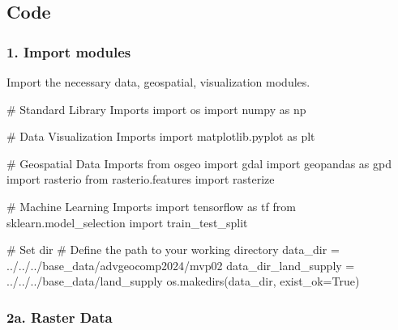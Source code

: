 \documentclass[
  letterpaper,
]{article}
\newenvironment{Shaded}{\begin{snugshade}}{\end{snugshade}}
\newcommand{\CommentTok}[1]{\textcolor[rgb]{0.37,0.37,0.37}{#1}}
\newcommand{\ImportTok}[1]{\textcolor[rgb]{0.00,0.46,0.62}{#1}}
\newcommand{\NormalTok}[1]{\textcolor[rgb]{0.00,0.23,0.31}{#1}}
\newcommand{\OperatorTok}[1]{\textcolor[rgb]{0.37,0.37,0.37}{#1}}
\newcommand{\StringTok}[1]{\textcolor[rgb]{0.13,0.47,0.30}{#1}}
\newcommand{\VariableTok}[1]{\textcolor[rgb]{0.07,0.07,0.07}{#1}}
\begin{document}
\subsection{Code}\label{code}

\subsubsection{1. Import modules}\label{import-modules}

Import the necessary data, geospatial, visualization modules.

\begin{Shaded}
\begin{Highlighting}[]
\CommentTok{\# Standard Library Imports}
\ImportTok{import}\NormalTok{ os}
\ImportTok{import}\NormalTok{ numpy }\ImportTok{as}\NormalTok{ np}

\CommentTok{\# Data Visualization Imports}
\ImportTok{import}\NormalTok{ matplotlib.pyplot }\ImportTok{as}\NormalTok{ plt}

\CommentTok{\# Geospatial Data Imports}
\ImportTok{from}\NormalTok{ osgeo }\ImportTok{import}\NormalTok{ gdal}
\ImportTok{import}\NormalTok{ geopandas }\ImportTok{as}\NormalTok{ gpd}
\ImportTok{import}\NormalTok{ rasterio}
\ImportTok{from}\NormalTok{ rasterio.features }\ImportTok{import}\NormalTok{ rasterize}

\CommentTok{\# Machine Learning Imports}
\ImportTok{import}\NormalTok{ tensorflow }\ImportTok{as}\NormalTok{ tf}
\ImportTok{from}\NormalTok{ sklearn.model\_selection }\ImportTok{import}\NormalTok{ train\_test\_split}

\CommentTok{\# Set dir}
\CommentTok{\# Define the path to your working directory}
\NormalTok{data\_dir }\OperatorTok{=} \StringTok{\textquotesingle{}../../../base\_data/advgeocomp2024/mvp02\textquotesingle{}}
\NormalTok{data\_dir\_land\_supply }\OperatorTok{=} \StringTok{\textquotesingle{}../../../base\_data/land\_supply\textquotesingle{}}
\NormalTok{os.makedirs(data\_dir, exist\_ok}\OperatorTok{=}\VariableTok{True}\NormalTok{)}
\end{Highlighting}
\end{Shaded}

\subsubsection{2a. Raster Data}\label{a.-raster-data}
\end{document}
